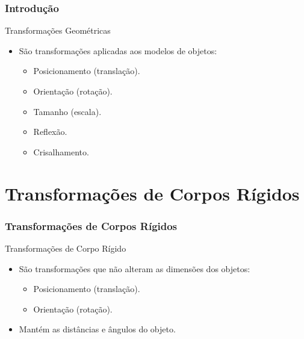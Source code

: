 \documentclass{beamer}
\begin{document}
\begin{frame}
\frametitle{Introdução}


	\begin{block}{Transformações Geométricas}
		\begin{itemize}
			\item São transformações aplicadas aos modelos de objetos:
				\begin{itemize}
					\item Posicionamento (translação).
					\item Orientação (rotação). 
					\item Tamanho (escala).
					\item Reflexão.
					\item Crisalhamento.
				\end{itemize}
		\end{itemize}
	\end{block}
	
\end{frame}

\section{Transformações de Corpos Rígidos}
\begin{frame}
\frametitle{Transformações de Corpos Rígidos}


	\begin{block}{Transformações de Corpo Rígido}
		\begin{itemize}
			\item São transformações que não alteram as dimensões dos objetos:
				\begin{itemize}
					\item Posicionamento (translação).
					\item Orientação (rotação).
				\end{itemize}
			\item Mantém as distâncias e ângulos do objeto.
		\end{itemize}
	\end{block}
	
\end{frame}
\end{document}

